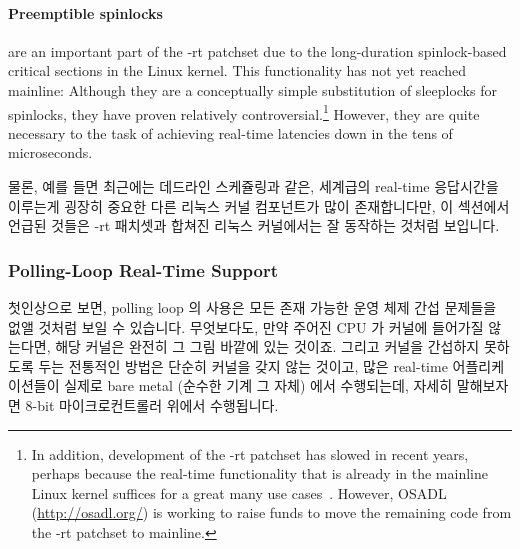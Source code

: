 \paragraph{Preemptible spinlocks}
are an important part of the -rt patchset due to the long-duration
spinlock-based critical sections in the Linux kernel.
This functionality has not yet reached mainline: Although they are a conceptually
simple substitution of sleeplocks for spinlocks, they have proven relatively
controversial.\footnote{
	In addition, development of the -rt patchset has slowed in recent
	years, perhaps because the real-time functionality that is already
	in the mainline Linux kernel suffices for a great many use
	cases~\cite{JakeEdge2013Future-rtLinux,JakeEdge2014Future-rtLinux}.
	However, OSADL (\url{http://osadl.org/}) is working to raise funds
	to move the remaining code from the -rt patchset to mainline.}
However, they are quite necessary to the task of achieving real-time
latencies down in the tens of microseconds.
\fi

물론, 예를 들면 최근에는 데드라인 스케쥴링과 같은, 세계급의 real-time
응답시간을 이루는게 굉장히 중요한 다른 리눅스 커널 컴포넌트가 많이
존재합니다만, 이 섹션에서 언급된 것들은 -rt 패치셋과 합쳐진 리눅스 커널에서는
잘 동작하는 것처럼 보입니다.

\subsubsection{Polling-Loop Real-Time Support}
\label{sec:advsync:Polling-Loop Real-Time Support}

첫인상으로 보면, polling loop 의 사용은 모든 존재 가능한 운영 체제 간섭
문제들을 없앨 것처럼 보일 수 있습니다.
무엇보다도, 만약 주어진 CPU 가 커널에 들어가질 않는다면, 해당 커널은 완전히 그
그림 바깥에 있는 것이죠.
그리고 커널을 간섭하지 못하도록 두는 전통적인 방법은 단순히 커널을 갖지 않는
것이고, 많은 real-time 어플리케이션들이 실제로 bare metal (순수한 기계 그 자체)
에서 수행되는데, 자세히 말해보자면 8-bit 마이크로컨트롤러 위에서 수행됩니다.


